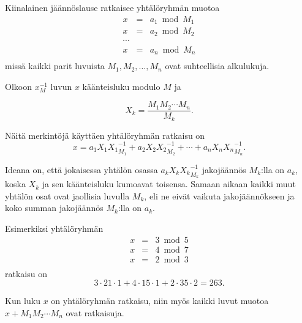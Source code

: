 Kiinalainen jäännöslause ratkaisee yhtälöryhmän muotoa
\[
\begin{array}{lcl}
x & = & a_1 \bmod M_1 \\
x & = & a_2 \bmod M_2 \\
\cdots \\
x & = & a_n \bmod M_n \\
\end{array}
\]
missä kaikki parit luvuista $M_1,M_2,\ldots,M_n$
ovat suhteellisia alkulukuja.

Olkoon $x^{-1}_M$ luvun $x$ käänteisluku
modulo $M$ ja

\[ X_k = \frac{M_1 M_2 \cdots M_n}{M_k}.\]

Näitä merkintöjä käyttäen yhtälöryhmän ratkaisu on
\[x = a_1 X_1 {X_1}^{-1}_{M_1} + a_2 X_2 {X_2}^{-1}_{M_2} + \cdots + a_n X_n {X_n}^{-1}_{M_n}.\]

Ideana on, että jokaisessa yhtälön osassa
$a_k X_k {X_k}^{-1}_{M_k}$
jakojäännös $M_k$:lla on $a_k$,
koska $X_k$ ja sen käänteisluku kumoavat toisensa.
Samaan aikaan kaikki muut yhtälön osat ovat jaollisia luvulla
$M_k$, eli ne eivät vaikuta jakojäännökseen ja
koko summan jakojäännös $M_k$:lla on $a_k$.

Esimerkiksi yhtälöryhmän
\[
\begin{array}{lcl}
x & = & 3 \bmod 5 \\
x & = & 4 \bmod 7 \\
x & = & 2 \bmod 3 \\
\end{array}
\]
ratkaisu on
\[ 3 \cdot 21 \cdot 1 + 4 \cdot 15 \cdot 1 + 2 \cdot 35 \cdot 2 = 263.\]

Kun luku $x$ on yhtälöryhmän ratkaisu,
niin myös kaikki luvut muotoa
$x+M_1 M_2 \cdots M_n$ ovat ratkaisuja.

